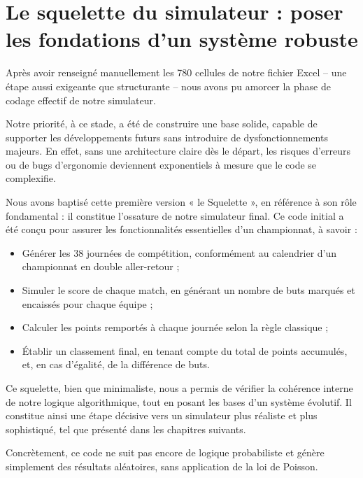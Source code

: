 \documentclass[12pt]{report}
\begin{document}
\section{Le squelette du simulateur : poser les fondations d’un système robuste}

Après avoir renseigné manuellement les 780 cellules de notre fichier Excel – une étape aussi exigeante que structurante – nous avons pu amorcer la phase de codage effectif de notre simulateur.

Notre priorité, à ce stade, a été de construire une base solide, capable de supporter les développements futurs sans introduire de dysfonctionnements majeurs. En effet, sans une architecture claire dès le départ, les risques d’erreurs ou de bugs d’ergonomie deviennent exponentiels à mesure que le code se complexifie.

Nous avons baptisé cette première version « le Squelette », en référence à son rôle fondamental : il constitue l’ossature de notre simulateur final. Ce code initial a été conçu pour assurer les fonctionnalités essentielles d’un championnat, à savoir :\\
\begin{itemize}
  \item Générer les 38 journées de compétition, conformément au calendrier d’un championnat en double aller-retour ;
  \item Simuler le score de chaque match, en générant un nombre de buts marqués et encaissés pour chaque équipe ;
  \item Calculer les points remportés à chaque journée selon la règle classique ;
  \item Établir un classement final, en tenant compte du total de points accumulés, et, en cas d’égalité, de la différence de buts.\\
\end{itemize}

Ce squelette, bien que minimaliste, nous a permis de vérifier la cohérence interne de notre logique algorithmique, tout en posant les bases d’un système évolutif. Il constitue ainsi une étape décisive vers un simulateur plus réaliste et plus sophistiqué, tel que présenté dans les chapitres suivants.

Concrètement, ce code ne suit pas encore de logique probabiliste et génère simplement des résultats aléatoires, sans application de la loi de Poisson.
\end{document}
